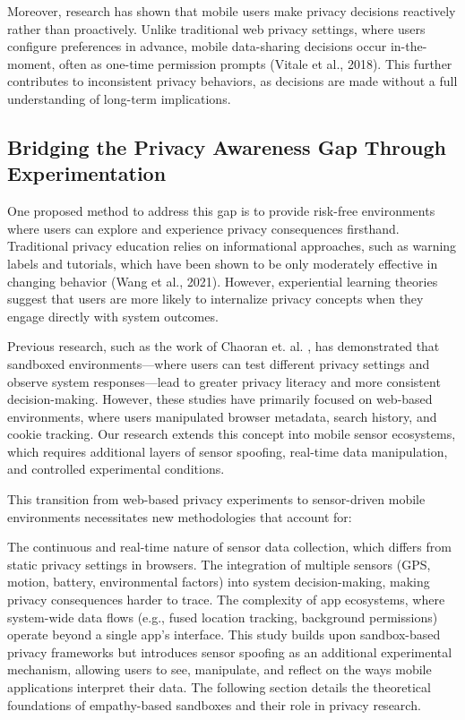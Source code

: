 \documentclass[acmlarge, nonacm]{acmart}
\begin{document}
Moreover, research has shown that mobile users make privacy decisions reactively rather than proactively. Unlike traditional web privacy settings, where users configure preferences in advance, mobile data-sharing decisions occur in-the-moment, often as one-time permission prompts (Vitale et al., 2018). This further contributes to inconsistent privacy behaviors, as decisions are made without a full understanding of long-term implications.

\subsection{Bridging the Privacy Awareness Gap Through Experimentation}
One proposed method to address this gap is to provide risk-free environments where users can explore and experience privacy consequences firsthand. Traditional privacy education relies on informational approaches, such as warning labels and tutorials, which have been shown to be only moderately effective in changing behavior (Wang et al., 2021). However, experiential learning theories suggest that users are more likely to internalize privacy concepts when they engage directly with system outcomes.

Previous research, such as the work of Chaoran et. al. \cite{Chaoran2023EmpathySandbox}, has demonstrated that sandboxed environments—where users can test different privacy settings and observe system responses—lead to greater privacy literacy and more consistent decision-making. However, these studies have primarily focused on web-based environments, where users manipulated browser metadata, search history, and cookie tracking. Our research extends this concept into mobile sensor ecosystems, which requires additional layers of sensor spoofing, real-time data manipulation, and controlled experimental conditions.

This transition from web-based privacy experiments to sensor-driven mobile environments necessitates new methodologies that account for:

The continuous and real-time nature of sensor data collection, which differs from static privacy settings in browsers.
The integration of multiple sensors (GPS, motion, battery, environmental factors) into system decision-making, making privacy consequences harder to trace.
The complexity of app ecosystems, where system-wide data flows (e.g., fused location tracking, background permissions) operate beyond a single app’s interface.
This study builds upon sandbox-based privacy frameworks but introduces sensor spoofing as an additional experimental mechanism, allowing users to see, manipulate, and reflect on the ways mobile applications interpret their data. The following section details the theoretical foundations of empathy-based sandboxes and their role in privacy research.
\end{document}
